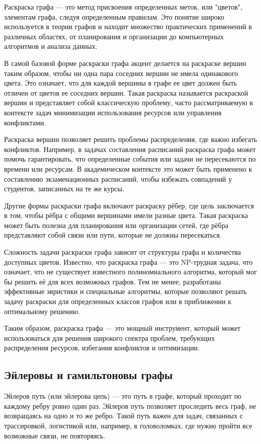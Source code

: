 Раскраска графа — это метод присвоения определенных меток, или "цветов", элементам графа, следуя определенным правилам. Это понятие широко используется в теории графов и находит множество практических применений в различных областях, от планирования и организации до компьютерных алгоритмов и анализа данных.

В самой базовой форме раскраски графа акцент делается на раскраске вершин таким образом, чтобы ни одна пара соседних вершин не имела одинакового цвета. Это означает, что для каждой вершины в графе ее цвет должен быть отличен от цветов ее соседних вершин. Такая раскраска называется раскраской вершин и представляет собой классическую проблему, часто рассматриваемую в контексте задач минимизации использования ресурсов или управления конфликтами.

Раскраска вершин позволяет решить проблемы распределения, где важно избегать конфликтов. Например, в задачах составления расписаний раскраска графа может помочь гарантировать, что определенные события или задачи не пересекаются по времени или ресурсам. В академическом контексте это может быть применено к составлению экзаменационных расписаний, чтобы избежать совпадений у студентов, записанных на те же курсы.

Другие формы раскраски графа включают раскраску рёбер, где цель заключается в том, чтобы рёбра с общими вершинами имели разные цвета. Такая раскраска может быть полезна для планирования или организации сетей, где рёбра представляют собой связи или пути, которые не должны пересекаться.

Сложность задачи раскраски графа зависит от структуры графа и количества доступных цветов. Известно, что раскраска графа — это NP-трудная задача, что означает, что не существует известного полиномиального алгоритма, который мог бы решить её для всех возможных графов. Тем не менее, разработаны эффективные эвристики и специальные алгоритмы, которые позволяют решать задачу раскраски для определенных классов графов или в приближении к оптимальному решению.

Таким образом, раскраска графа — это мощный инструмент, который может использоваться для решения широкого спектра проблем, требующих распределения ресурсов, избегания конфликтов и оптимизации.


\subsection{Эйлеровы и гамильтоновы графы}

Эйлеров путь (или эйлерова цепь) — это путь в графе, который проходит по каждому ребру ровно один раз. Эйлеров путь позволяет проследить весь граф, не возвращаясь на одно и то же ребро. Такой путь важен для задач, связанных с трассировкой, логистикой или, например, в головоломках, где нужно пройти все возможные связи, не повторяясь.

